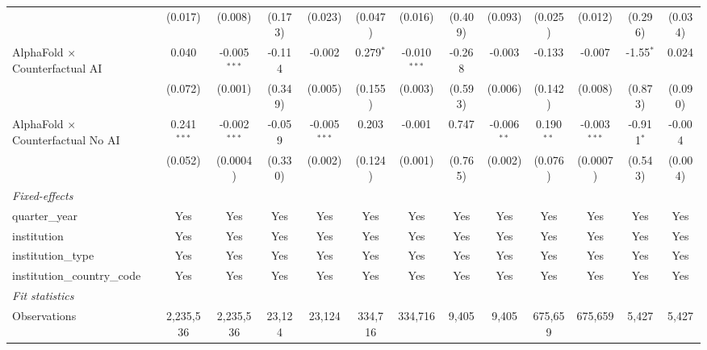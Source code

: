 \begin{tabular}{lcccccccccccc}
                                            & (0.017)       & (0.008)        & (0.173)      & (0.023)        & (0.047)       & (0.016)        & (0.409) & (0.093)       & (0.025)       & (0.012)        & (0.296)       & (0.034)\\   
   AlphaFold $\times$ Counterfactual AI     & 0.040         & -0.005$^{***}$ & -0.114       & -0.002         & 0.279$^{*}$   & -0.010$^{***}$ & -0.268  & -0.003        & -0.133        & -0.007         & -1.55$^{*}$   & 0.024\\   
                                            & (0.072)       & (0.001)        & (0.349)      & (0.005)        & (0.155)       & (0.003)        & (0.593) & (0.006)       & (0.142)       & (0.008)        & (0.873)       & (0.090)\\   
   AlphaFold $\times$ Counterfactual No AI  & 0.241$^{***}$ & -0.002$^{***}$ & -0.059       & -0.005$^{***}$ & 0.203         & -0.001         & 0.747   & -0.006$^{**}$ & 0.190$^{**}$  & -0.003$^{***}$ & -0.911$^{*}$  & -0.004\\   
                                            & (0.052)       & (0.0004)       & (0.330)      & (0.002)        & (0.124)       & (0.001)        & (0.765) & (0.002)       & (0.076)       & (0.0007)       & (0.543)       & (0.004)\\   
   \midrule
   \emph{Fixed-effects}\\
   quarter\_year                            & Yes           & Yes            & Yes          & Yes            & Yes           & Yes            & Yes     & Yes           & Yes           & Yes            & Yes           & Yes\\  
   institution                              & Yes           & Yes            & Yes          & Yes            & Yes           & Yes            & Yes     & Yes           & Yes           & Yes            & Yes           & Yes\\  
   institution\_type                        & Yes           & Yes            & Yes          & Yes            & Yes           & Yes            & Yes     & Yes           & Yes           & Yes            & Yes           & Yes\\  
   institution\_country\_code               & Yes           & Yes            & Yes          & Yes            & Yes           & Yes            & Yes     & Yes           & Yes           & Yes            & Yes           & Yes\\  
   \midrule
   \emph{Fit statistics}\\
   Observations                             & 2,235,536     & 2,235,536      & 23,124       & 23,124         & 334,716       & 334,716        & 9,405   & 9,405         & 675,659       & 675,659        & 5,427         & 5,427\\  

\end{tabular}
